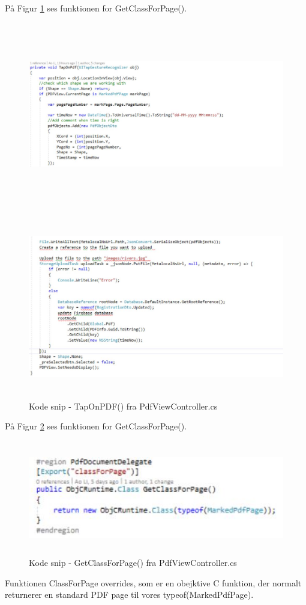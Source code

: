 På Figur \ref{fig:TapOnPDF2} ses funktionen for GetClassForPage().
\begin{figure}[H] %
	\centering
	\includegraphics[height=8cm, width=15cm]{../ArkitekturDesign/Design/RegisterPDF/TapOnPDF1}
\end{figure}
\begin{figure}[H] %
	\centering
	\includegraphics[height=8cm, width=15cm]{../ArkitekturDesign/Design/RegisterPDF/TapOnPDF2}
	\caption{Kode snip - TapOnPDF() fra PdfViewController.cs}
	\label{fig:TapOnPDF2}
\end{figure}


\clearpage

På Figur \ref{fig:ClassPage} ses funktionen for GetClassForPage().
\begin{figure}[H] %
	\centering
	\includegraphics[height=5cm, width=15cm]{../ArkitekturDesign/Design/RegisterPDF/ClassPage}
	\caption{Kode snip - GetClassForPage() fra PdfViewController.cs}
	\label{fig:ClassPage}
\end{figure}
Funktionen ClassForPage overrides, som er en obejktive C funktion, der normalt returnerer en standard PDF page til vores typeof(MarkedPdfPage).

